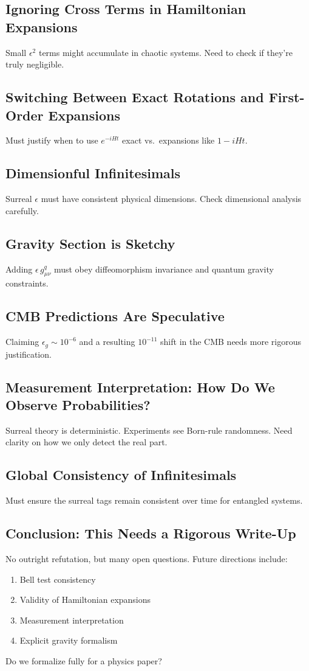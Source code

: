 \documentclass{article}
\begin{document}
\subsection{Ignoring Cross Terms in Hamiltonian Expansions}
Small \(\epsilon^2\) terms might accumulate in chaotic systems. Need to check if they're truly negligible.

\subsection{Switching Between Exact Rotations and First-Order Expansions}
Must justify when to use \(e^{-iHt}\) exact vs.\ expansions like \(1 - iHt\).

\subsection{Dimensionful Infinitesimals}
Surreal \(\epsilon\) must have consistent physical dimensions. Check dimensional analysis carefully.

\subsection{Gravity Section is Sketchy}
Adding \(\epsilon\,g_{\mu\nu}^q\) must obey diffeomorphism invariance and quantum gravity constraints.

\subsection{CMB Predictions Are Speculative}
Claiming \(\epsilon_g \sim 10^{-6}\) and a resulting \(10^{-11}\) shift in the CMB needs more rigorous justification.

\subsection{Measurement Interpretation: How Do We Observe Probabilities?}
Surreal theory is deterministic. Experiments see Born-rule randomness. Need clarity on how we only detect the real part.

\subsection{Global Consistency of Infinitesimals}
Must ensure the surreal tags remain consistent over time for entangled systems.

\subsection{Conclusion: This Needs a Rigorous Write-Up}
No outright refutation, but many open questions. Future directions include:
\begin{enumerate}
\item Bell test consistency
\item Validity of Hamiltonian expansions
\item Measurement interpretation
\item Explicit gravity formalism
\end{enumerate}
Do we formalize fully for a physics paper?
\end{document}
